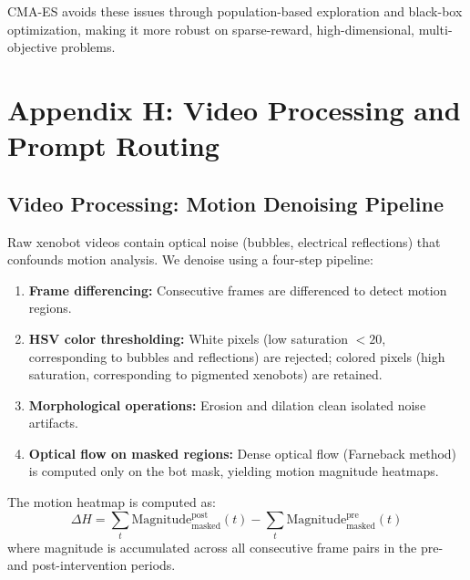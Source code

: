 \documentclass{article}
\begin{document}
CMA-ES avoids these issues through population-based exploration and black-box optimization, making it more robust on sparse-reward, high-dimensional, multi-objective problems.

\section*{Appendix H: Video Processing and Prompt Routing}
\label{app:video_and_routing}

\subsection{Video Processing: Motion Denoising Pipeline}

Raw xenobot videos contain optical noise (bubbles, electrical reflections) that confounds motion analysis. We denoise using a four-step pipeline:

\begin{enumerate}
\item \textbf{Frame differencing:} Consecutive frames are differenced to detect motion regions.
\item \textbf{HSV color thresholding:} White pixels (low saturation $< 20$, corresponding to bubbles and reflections) are rejected; colored pixels (high saturation, corresponding to pigmented xenobots) are retained.
\item \textbf{Morphological operations:} Erosion and dilation clean isolated noise artifacts.
\item \textbf{Optical flow on masked regions:} Dense optical flow (Farneback method) is computed only on the bot mask, yielding motion magnitude heatmaps.
\end{enumerate}

The motion heatmap is computed as:
\begin{equation}
\Delta H = \sum_t \text{Magnitude}_{\text{masked}}^{\text{post}}(t) - \sum_t \text{Magnitude}_{\text{masked}}^{\text{pre}}(t)
\end{equation}
where magnitude is accumulated across all consecutive frame pairs in the pre- and post-intervention periods.
\end{document}
